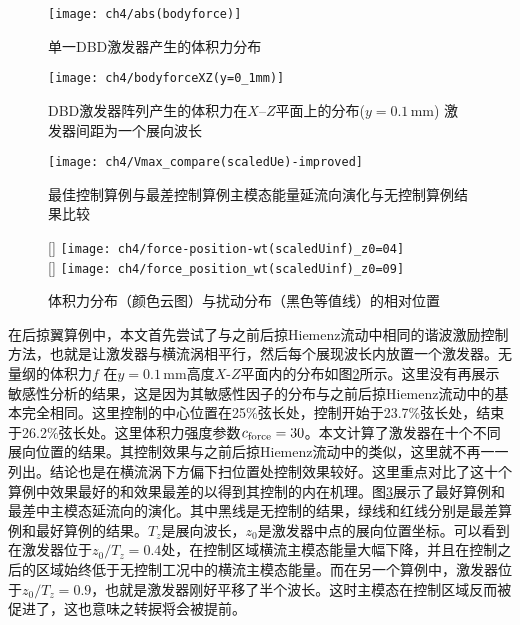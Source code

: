 \begin{figure}[htb]
\centering
  \texttt{[image: ch4/abs(bodyforce)]}
  \caption{单一DBD激发器产生的体积力分布}%
  \label{f:forceshape}
\end{figure}

\begin{figure}[htb]
\centering
  \texttt{[image: ch4/bodyforceXZ(y=0\_1mm)]}
  \caption{DBD激发器阵列产生的体积力在$X$--$Z$平面上的分布($y= 0.1$\,mm) 激发器间距为一个展向波长}%
  \label{f:force_XZ_1perwavelength}
\end{figure}

\begin{figure}[htb]
\centering
  \texttt{[image: ch4/Vmax\_compare(scaledUe)-improved]}
  \caption{最佳控制算例与最差控制算例主模态能量延流向演化与无控制算例结果比较}%
  \label{f:bestworst}
\end{figure}
\begin{figure}[htb]
\centering
  [\textwidth]
  {\texttt{[image: ch4/force-position-wt(scaledUinf)\_z0=04]}
}
  \\\bigskip
  [\textwidth]
  {
  \texttt{[image: ch4/force\_position\_wt(scaledUinf)\_z0=09]}
  }
  \caption{体积力分布（颜色云图）与扰动分布（黑色等值线）的相对位置}
  \label{f:pla_postion}
\end{figure}

在后掠翼算例中，本文首先尝试了与之前后掠Hiemenz流动中相同的谐波激励控制方法，也就是让激发器与横流涡相平行，然后每个展现波长内放置一个激发器。无量纲的体积力$f$ 在$y=0.1$\,mm高度$X$-$Z$平面内的分布如图\ref{f:force_XZ_1perwavelength}所示。这里没有再展示敏感性分析的结果，这是因为其敏感性因子的分布与之前后掠Hiemenz流动中的基本完全相同。这里控制的中心位置在25\%弦长处，控制开始于23.7\%弦长处，结束于26.2\%弦长处。这里体积力强度参数$c_{\rm force}= 30$。本文计算了激发器在十个不同展向位置的结果。其控制效果与之前后掠Hiemenz流动中的类似，这里就不再一一列出。结论也是在横流涡下方偏下扫位置处控制效果较好。这里重点对比了这十个算例中效果最好的和效果最差的以得到其控制的内在机理。图\ref{f:bestworst}展示了最好算例和最差中主模态延流向的演化。其中黑线是无控制的结果，绿线和红线分别是最差算例和最好算例的结果。$T_z$是展向波长，$z_0$是激发器中点的展向位置坐标。可以看到在激发器位于$z_0/T_z=0.4$处，在控制区域横流主模态能量大幅下降，并且在控制之后的区域始终低于无控制工况中的横流主模态能量。而在另一个算例中，激发器位于$z_0/T_z=0.9$，也就是激发器刚好平移了半个波长。这时主模态在控制区域反而被促进了，这也意味之转捩将会被提前。

